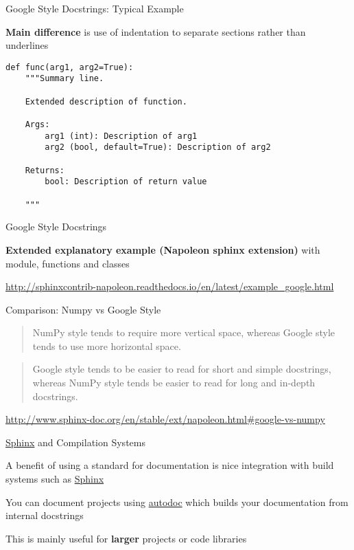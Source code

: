 \documentclass{beamer}
\begin{document}
\begin{frame}[fragile]{Google Style Docstrings: Typical Example}

\textbf{Main difference} is use of indentation to separate sections rather than underlines

\begin{verbatim}
def func(arg1, arg2=True):
    """Summary line.

    Extended description of function.

    Args:
        arg1 (int): Description of arg1
        arg2 (bool, default=True): Description of arg2

    Returns:
        bool: Description of return value

    """
\end{verbatim}
\end{frame}


\begin{frame}{Google Style Docstrings}

\textbf{Extended explanatory example (Napoleon sphinx extension)} with module, functions and classes

\url{http://sphinxcontrib-napoleon.readthedocs.io/en/latest/example_google.html}

\end{frame}


\begin{frame}{Comparison: Numpy vs Google Style}

\begin{quote}
NumPy style tends to require more vertical space, whereas Google style tends to use more horizontal space. 
\end{quote}

\begin{quote}
Google style tends to be easier to read for short and simple docstrings, whereas NumPy style tends be easier to read for long and in-depth docstrings.
\end{quote}

\begin{flushright}
\url{http://www.sphinx-doc.org/en/stable/ext/napoleon.html\#google-vs-numpy}
\end{flushright}

\end{frame}


\begin{frame}{\href{http://www.sphinx-doc.org/en/stable/}{Sphinx} and Compilation Systems}

A benefit of using a standard for documentation is nice integration with build systems such as \href{http://www.sphinx-doc.org/en/stable/}{Sphinx}

You can document projects using \href{http://www.sphinx-doc.org/en/stable/ext/autodoc.html}{autodoc} which builds your documentation from internal docstrings

This is mainly useful for \textbf{larger} projects or code libraries

\end{frame}
\end{document}

